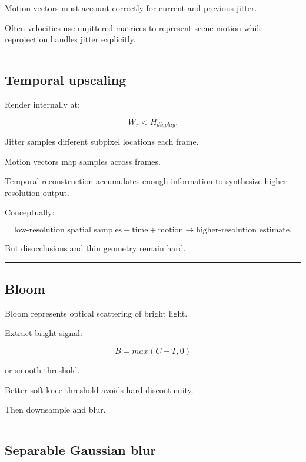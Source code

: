 Motion vectors must account correctly for current and previous jitter.

Often velocities use unjittered matrices to represent scene motion while reprojection handles jitter explicitly.

\begin{center}\rule{0.5\linewidth}{0.5pt}\end{center}

\subsection{Temporal upscaling}\label{04-visual-computing-ii-ch040-temporal-upscaling}

Render internally at:

\[
W_r<H_{display}.
\]

Jitter samples different subpixel locations each frame.

Motion vectors map samples across frames.

Temporal reconstruction accumulates enough information to synthesize higher-resolution output.

Conceptually:

\[
\boxed{
\text{low-resolution spatial samples}
+
\text{time}
+
\text{motion}
\rightarrow
\text{higher-resolution estimate}.
}
\]

But disocclusions and thin geometry remain hard.

\begin{center}\rule{0.5\linewidth}{0.5pt}\end{center}

\subsection{Bloom}\label{04-visual-computing-ii-ch040-bloom}

Bloom represents optical scattering of bright light.

Extract bright signal:

\[
B=
max(
C-T,
0
)
\]

or smooth threshold.

Better soft-knee threshold avoids hard discontinuity.

Then downsample and blur.

\begin{center}\rule{0.5\linewidth}{0.5pt}\end{center}

\subsection{Separable Gaussian blur}\label{04-visual-computing-ii-ch040-separable-gaussian-blur}

